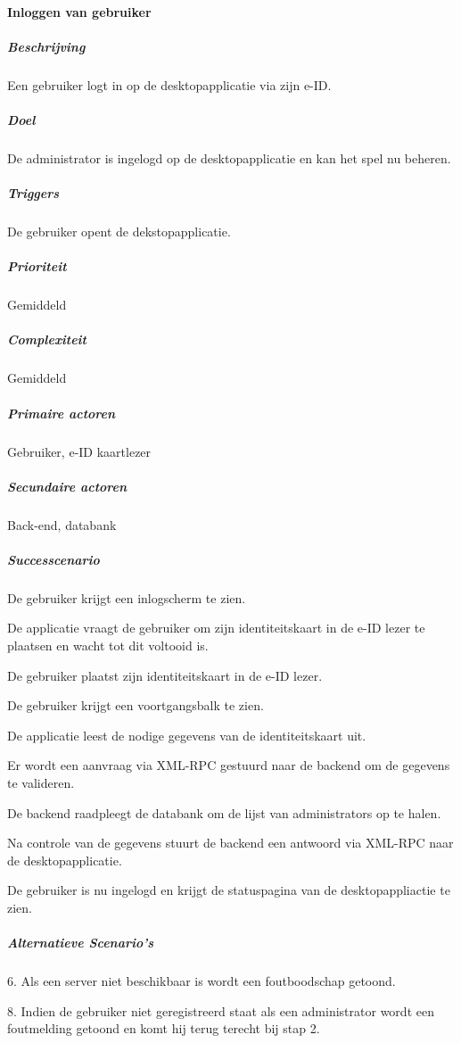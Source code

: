 \paragraph{Inloggen van gebruiker}
\begin{compact}
\subparagraph{Beschrijving} Een gebruiker logt in op de desktopapplicatie via zijn e-ID.
\subparagraph{Doel} De administrator is ingelogd op de desktopapplicatie en kan het spel nu beheren.
\subparagraph{Triggers}De gebruiker opent de dekstopapplicatie.
\subparagraph{Prioriteit}Gemiddeld
\subparagraph{Complexiteit}Gemiddeld
\subparagraph{Primaire actoren}Gebruiker, e-ID kaartlezer
\subparagraph{Secundaire actoren}Back-end, databank
\subparagraph{Successcenario}
\begin{enumerate_compact}
 \item De gebruiker krijgt een inlogscherm te zien.
 \item De applicatie vraagt de gebruiker om zijn identiteitskaart in de e-ID lezer te plaatsen en wacht tot dit voltooid is.
 \item De gebruiker plaatst zijn identiteitskaart in de e-ID lezer.
 \item De gebruiker krijgt een voortgangsbalk te zien.
 \item De applicatie leest de nodige gegevens van de identiteitskaart uit.
 \item Er wordt een aanvraag via XML-RPC gestuurd naar de backend om de gegevens te valideren.
 \item De backend raadpleegt de databank om de lijst van administrators op te halen.
 \item Na controle van de gegevens stuurt de backend een antwoord via XML-RPC naar de desktopapplicatie.
 \item De gebruiker is nu ingelogd en krijgt de statuspagina van de desktopappliactie te zien.
\end{enumerate_compact}
\subparagraph{Alternatieve Scenario's}
\begin{enumerate_compact}
	\item[6.] Als een server niet beschikbaar is wordt een foutboodschap getoond.
	\item[8.] Indien de gebruiker niet geregistreerd staat als een administrator wordt een foutmelding getoond en komt hij terug terecht bij stap 2.
\end{enumerate_compact}
\end{compact}

